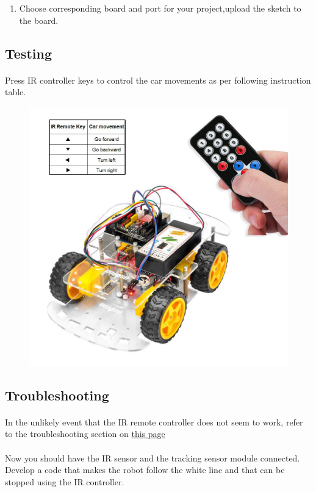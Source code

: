 \documentclass{article}
\begin{document}
\begin{enumerate}
	
	\item Choose corresponding board and port for your project,upload the sketch to the board.
\end{enumerate}


\subsection{Testing}

\paragraph{} Press IR controller keys to control the car movements as per following instruction table.

\begin{figure}[H]
	\centering
	\includegraphics[width=0.5\linewidth]{Images/testing1}
	\label{fig:testing1}
\end{figure}

\subsection{Troubleshooting}

\paragraph{} In the unlikely event that the IR remote controller does not seem to work, refer to the troubleshooting section on \href{https://osoyoo.com/2020/05/12/osoyoo-v2-1-robot-car-kit-lesson-2-ir-remote-control-robot-car/}{this page}

\paragraph{}Now you should have the IR sensor and the tracking sensor module connected. Develop a code that makes the robot follow the white line and that can be stopped using the IR controller.
\end{document}
